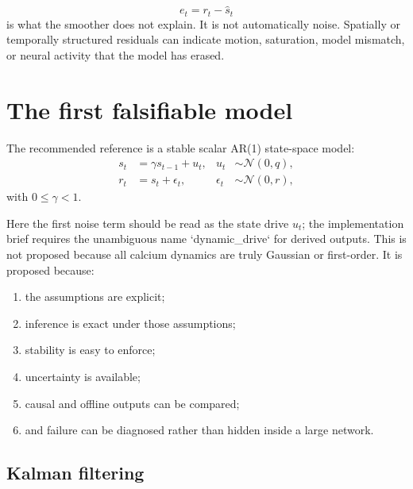 \documentclass[11pt]{article}
\begin{document}
\begin{equation}
e_t=r_t-\widehat s_t
\end{equation}
is what the smoother does not explain. It is not automatically noise.
Spatially or temporally structured residuals can indicate motion, saturation,
model mismatch, or neural activity that the model has erased.

\section{The first falsifiable model}

The recommended reference is a stable scalar AR(1) state-space model:
\begin{align}
s_t &= \gamma s_{t-1}+u_t,
&
u_t &\sim\mathcal N(0,q), \label{eq:state}\\
r_t &= s_t+\epsilon_t,
&
\epsilon_t &\sim\mathcal N(0,r), \label{eq:obs}
\end{align}
with \(0\leq\gamma<1\).

Here the first noise term should be read as the state drive \(u_t\); the
implementation brief requires the unambiguous name `dynamic_drive` for derived
outputs. This is not proposed because all calcium dynamics are truly Gaussian
or first-order. It is proposed because:

\begin{enumerate}[leftmargin=*]
\item the assumptions are explicit;
\item inference is exact under those assumptions;
\item stability is easy to enforce;
\item uncertainty is available;
\item causal and offline outputs can be compared;
\item and failure can be diagnosed rather than hidden inside a large network.
\end{enumerate}

\subsection{Kalman filtering}
\end{document}
